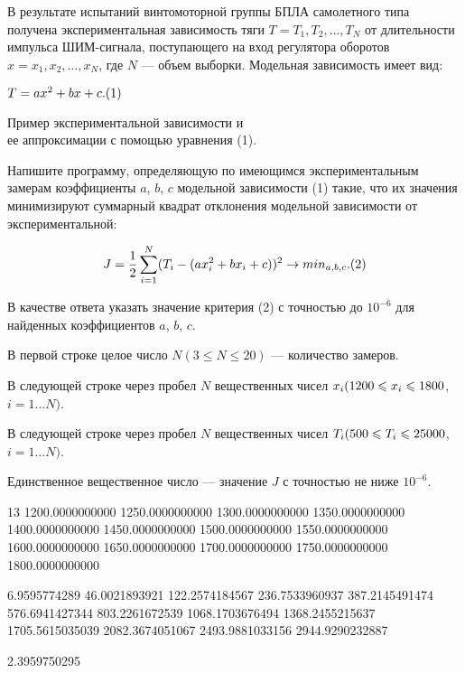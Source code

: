 
В результате испытаний винтомоторной группы БПЛА самолетного типа получена экспериментальная 
зависимость тяги $T= {T_1, T_2, \dots, T_N}$ от длительности импульса ШИМ-сигнала,
поступающего на вход регулятора оборотов $x = {x_1, x_2,
\dots ,x_N}$, где \linebreak $N$ — объем выборки. Модельная зависимость имеет вид:

$T= ax^2 + bx + c.\space(1)$


\begin{center}
    Пример экспериментальной зависимости и \\
    ее аппроксимации с помощью уравнения (1).
\end{center}

Напишите программу, определяющую по имеющимся
экспериментальным замерам коэффициенты $a$, $b$, $c$  модельной зависимости (1) 
такие, что их значения минимизируют суммарный квадрат отклонения модельной
зависимости от экспериментальной:

$$J=\frac{1}{2} \sum\limits_{i=1}^N(T_i-(ax_i^2+bx_i+c))^2 \to min_{a,b,c}.\space (2) $$

В качестве ответа указать значение критерия (2) с точностью до $10^{-6}$ для найденных коэффициентов 
$a$, $b$, $c$.


В первой строке целое число $N (3\leq N\leq 20)$  — количество замеров.

В следующей строке через пробел $N$  вещественных чисел $x_i\space (1200\leq x_i \leq 1800$,\linebreak $i = 1...N)$. 

В следующей строке через пробел $N$  вещественных чисел $T_i\space (500\leq T_i \leq 25000$, \linebreak $i = 1...N)$.

\outputfmtSection

Единственное вещественное число — значение  $J$  с точностью не ниже $10^{-6}$.


\begin{myverbbox}[\small]{\vinput}
    13
    1200.0000000000 1250.0000000000 1300.0000000000 1350.0000000000 
    1400.0000000000 1450.0000000000 1500.0000000000 1550.0000000000 
    1600.0000000000 1650.0000000000 1700.0000000000 1750.0000000000 
    1800.0000000000 
    
    6.9595774289 46.0021893921 122.2574184567 236.7533960937 
    387.2145491474 576.6941427344 803.2261672539 1068.1703676494 
    1368.2455215637 1705.5615035039 2082.3674051067 2493.9881033156 
    2944.9290232887
\end{myverbbox}
\begin{myverbbox}[\small]{\voutput}
    2.3959750295
\end{myverbbox}


